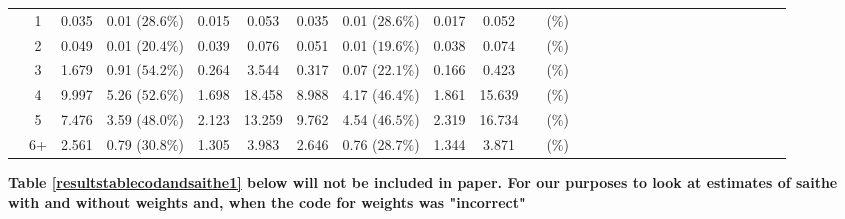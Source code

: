 \documentclass[a4paper 12pt]{article}
\numberwithin{equation}{section}
\begin{document}
\begin{tiny}
\begin{table}[h!]
\begin{tabular}{ccccccccccccccccccccccccccc}
\raisebox{1.5ex}{2018 Q1} & 1& 0.035 &0.01 ($28.6 \%$) & 0.015 & 0.053  & 0.035 &0.01 ($28.6 \%$) &0.017 &0.052 &  &  ($ \%$) \\[1ex]
& 2  & 0.049   & 0.01 ($20.4 \%$) &0.039 &0.076  &0.051  &0.01   ($19.6 \%$) &0.038 &0.074  & &  ($ \%$) \\[1ex]
& 3  & 1.679   & 0.91 ($54.2 \%$) &0.264 &3.544  &0.317  &0.07   ($22.1 \%$) &0.166 &0.423  & &  ($ \%$) \\[1ex]
& 4  & 9.997   &5.26 ($52.6 \%$)  &1.698 &18.458 &8.988  &4.17  ($46.4 \%$)  &1.861 &15.639 & &  ($ \%$) \\[1ex]
& 5  & 7.476   &3.59 ($48.0 \%$)  &2.123 &13.259 &9.762  &4.54 ($46.5 \%$)   &2.319 &16.734 & &  ($ \%$) \\[1ex]
& 6+ & 2.561   &0.79 ($30.8 \%$)  &1.305 &3.983  &2.646  &0.76  ($28.7 \%$)  &1.344 &3.871  & &  ($ \%$)\\[0.5ex]

\hline
\end{tabular}
\end{table}
\end{tiny}


{\bf Table \ref{resultstablecodandsaithe1} below will not be included in paper. For our purposes to look at estimates of saithe with and without weights and, when the code for weights was "incorrect"}





\clearpage
\end{document}
